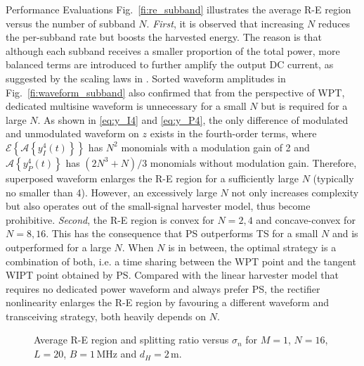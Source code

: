 \documentclass[journal]{IEEEtran}
\begin{document}
\begin{section}{Performance Evaluations}
		Fig.~\ref{fi:re_subband} illustrates the average R-E region versus the number of subband $N$. \textit{First}, it is observed that increasing $N$ reduces the per-subband rate but boosts the harvested energy. The reason is that although each subband receives a smaller proportion of the total power, more balanced terms are introduced to further amplify the output DC current, as suggested by the scaling laws in \cite{Clerckx2018b}. Sorted waveform amplitudes in Fig.~\ref{fi:waveform_subband} also confirmed that from the perspective of WPT, dedicated multisine waveform is unnecessary for a small $N$ but is required for a large $N$. As shown in \ref{eq:y_I4} and \ref{eq:y_P4}, the only difference of modulated and unmodulated waveform on $z$ exists in the fourth-order terms, where $\mathcal{E}\left\{\mathcal{A}\left\{y_{I}^4(t)\right\}\right\}$ has $N^2$ monomials with a modulation gain of \num{2} and $\mathcal{A}\left\{y_{P}^4(t)\right\}$ has $(2N^3+N)/3$ monomials without modulation gain. Therefore, superposed waveform enlarges the R-E region for a sufficiently large $N$ (typically no smaller than 4). However, an excessively large $N$ not only increases complexity but also operates out of the small-signal harvester model, thus become prohibitive. \textit{Second}, the R-E region is convex for $N = 2, 4$ and concave-convex for $N = 8, 16$. This has the consequence that PS outperforms TS for a small $N$ and is outperformed for a large $N$. When $N$ is in between, the optimal strategy is a combination of both, i.e. a time sharing between the WPT point and the tangent WIPT point obtained by PS. Compared with the linear harvester model that requires no dedicated power waveform and always prefer PS, the rectifier nonlinearity enlarges the R-E region by favouring a different waveform and transceiving strategy, both heavily depends on $N$.

		\begin{figure}[!t]
			\centering
			\begin{adjustbox}{width=\linewidth}
				
			\end{adjustbox}
			\caption{Average R-E region and splitting ratio versus $\sigma_n$ for $M=1$, $N=16$, $L=20$, $B=1\,\si{\MHz}$ and $d_H=2\,\si{\meter}$.}
			\label{fi:re_noise}
		\end{figure}


\end{section}
\end{document}

